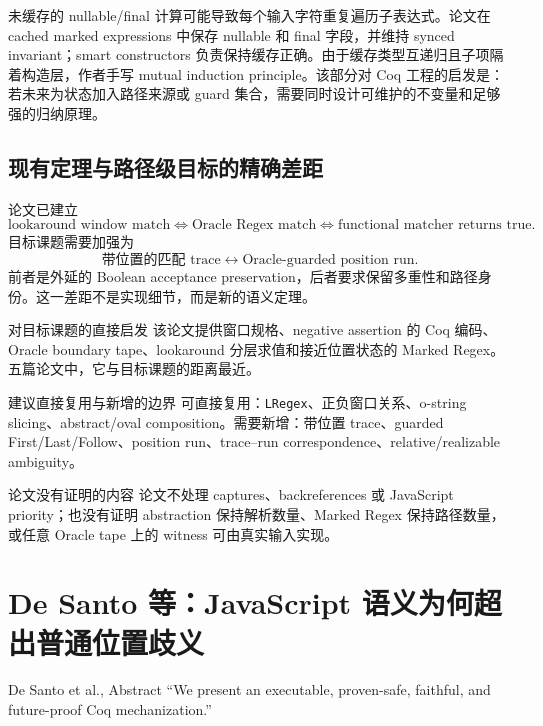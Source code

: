 \documentclass[UTF8,a4paper,12pt]{ctexart}
\begin{document}
未缓存的 nullable/final 计算可能导致每个输入字符重复遍历子表达式。论文在 cached marked expressions 中保存 nullable 和 final 字段，并维持 synced invariant；smart constructors 负责保持缓存正确。由于缓存类型互递归且子项隔着构造层，作者手写 mutual induction principle。该部分对 Coq 工程的启发是：若未来为状态加入路径来源或 guard 集合，需要同时设计可维护的不变量和足够强的归纳原理。

\subsection{现有定理与路径级目标的精确差距}

论文已建立
\[
\text{lookaround window match}
\iff
\text{Oracle Regex match}
\iff
\text{functional matcher returns true}.
\]
目标课题需要加强为
\[
\text{带位置的匹配 trace}
\longleftrightarrow
\text{Oracle-guarded position run}.
\]
前者是外延的 Boolean acceptance preservation，后者要求保留多重性和路径身份。这一差距不是实现细节，而是新的语义定理。

\begin{directlink}{对目标课题的直接启发}
该论文提供窗口规格、negative assertion 的 Coq 编码、Oracle boundary tape、lookaround 分层求值和接近位置状态的 Marked Regex。五篇论文中，它与目标课题的距离最近。
\end{directlink}

\begin{coqbox}{建议直接复用与新增的边界}
可直接复用：\texttt{LRegex}、正负窗口关系、o-string slicing、abstract/oval composition。需要新增：带位置 trace、guarded First/Last/Follow、position run、trace--run correspondence、relative/realizable ambiguity。
\end{coqbox}

\begin{boundarybox}{论文没有证明的内容}
论文不处理 captures、backreferences 或 JavaScript priority；也没有证明 abstraction 保持解析数量、Marked Regex 保持路径数量，或任意 Oracle tape 上的 witness 可由真实输入实现。
\end{boundarybox}


\section{De Santo 等：JavaScript 语义为何超出普通位置歧义}

\begin{paperquote}{De Santo et al., Abstract}
``We present an executable, proven-safe, faithful, and future-proof Coq mechanization.''
\end{paperquote}
\end{document}
